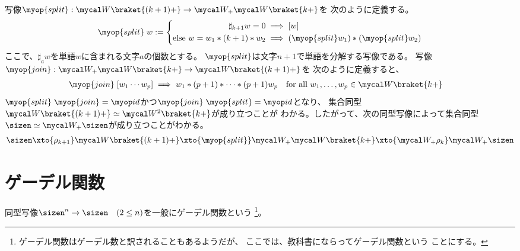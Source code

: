	写像$\myop{split}:\Word\braket{(k+1)+}\to\Word_+\Word\braket{k+}$を
	次のように定義する。
	\begin{equation*}\begin{split}
			\myop{split}\;w &:= \left\{\begin{split}
				\sharp_{k+1}w = 0 &\implies [w] \\
				\text{else }w = w_1*(k+1)*w_2 
				&\implies (\myop{split}w_1)*(\myop{split}w_2)
			\end{split}\right. \\ %
	\end{split}\end{equation*}
	ここで、$\sharp_aw$を単語$w$に含まれる文字$a$の個数とする。
	$\myop{split}$は文字$n+1$で単語を分解する写像である。
	写像$\myop{join}:\Word_+\Word\braket{k+}\to\Word\braket{(k+1)+}$を
	次のように定義すると、
	\begin{equation*}\begin{split}
		\myop{join}\;[w_1\cdots w_p] &\implies w_1*(p+1)*\cdots*(p+1)w_p
		\quad\text{for all }w_1,\dots,w_p\in\Word\braket{k+}
	\end{split}\end{equation*}
	$\myop{split}\;\myop{join}=\id$かつ$\myop{join}\;\myop{split}=\id$となり、
	集合同型$\Word\braket{(k+1)+}\simeq\Word^2\braket{k+}$が成り立つことが
	わかる。したがって、次の同型写像によって集合同型
	$\sizen\simeq\Word_+\sizen$が成り立つことがわかる。
	\begin{equation*}\begin{split}
		\sizen \xto{\rho_{k+1}} \Word\braket{(k+1)+} \xto{\myop{split}} 
		\Word_+\Word\braket{k+} \xto{\Word_+\rho_k} \Word_+\sizen
	\end{split}\end{equation*}
\section{ゲーデル関数}\label{s1:ゲーデル関数} %
	\begin{definition}[ゲーデル関数]\label{def:ゲーデル関数} %
		同型写像$\sizen^n\to\sizen \quad(2\le n)$を一般にゲーデル関数という
		\footnote{
			ゲーデル関数はゲーデル数と訳されることもあるようだが、
			ここでは、教科書\cite{takahashi:keisan}にならってゲーデル関数という
			ことにする。
		}。
	\end{definition} %


